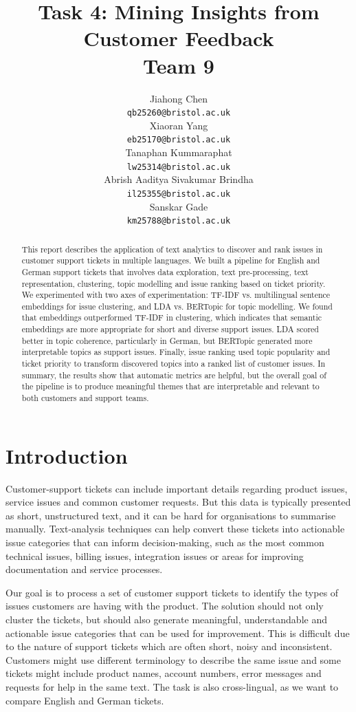\documentclass[11pt]{article}
\title{Task 4: Mining Insights from Customer Feedback\\
\large Team 9}
\author{Jiahong Chen \\
  \texttt{qb25260@bristol.ac.uk} \\\And
  Xiaoran Yang\\
  \texttt{eb25170@bristol.ac.uk} \\\And
  Tanaphan Kummaraphat \\
  \texttt{lw25314@bristol.ac.uk} \\\AND
  Abrish Aaditya Sivakumar Brindha \\
  \texttt{il25355@bristol.ac.uk} \\\And
  Sanskar Gade \\
  \texttt{km25788@bristol.ac.uk} \\}
\begin{document}
\maketitle
\begin{abstract}

This report describes the application of text analytics to discover and rank issues in customer support tickets in multiple languages. We built a pipeline for English and German support tickets that involves data exploration, text pre-processing, text representation, clustering, topic modelling and issue ranking based on ticket priority. We experimented with two axes of experimentation: TF-IDF vs. multilingual sentence embeddings for issue clustering, and LDA vs. BERTopic for topic modelling. We found that embeddings outperformed TF-IDF in clustering, which indicates that semantic embeddings are more appropriate for short and diverse support issues. LDA scored better in topic coherence, particularly in German, but BERTopic generated more interpretable topics as support issues. Finally, issue ranking used topic popularity and ticket priority to transform discovered topics into a ranked list of customer issues. In summary, the results show that automatic metrics are helpful, but the overall goal of the pipeline is to produce meaningful themes that are interpretable and relevant to both customers and support teams.

\end{abstract}

\section{Introduction}

Customer-support tickets can include important details regarding product issues, service issues and common customer requests. But this data is typically presented as short, unstructured text, and it can be hard for organisations to summarise manually. Text-analysis techniques can help convert these tickets into actionable issue categories that can inform decision-making, such as the most common technical issues, billing issues, integration issues or areas for improving documentation and service processes.

Our goal is to process a set of customer support tickets to identify the types of issues customers are having with the product. The solution should not only cluster the tickets, but should also generate meaningful, understandable and actionable issue categories that can be used for improvement. This is difficult due to the nature of support tickets which are often short, noisy and inconsistent. Customers might use different terminology to describe the same issue and some tickets might include product names, account numbers, error messages and requests for help in the same text. The task is also cross-lingual, as we want to compare English and German tickets.
\end{document}
